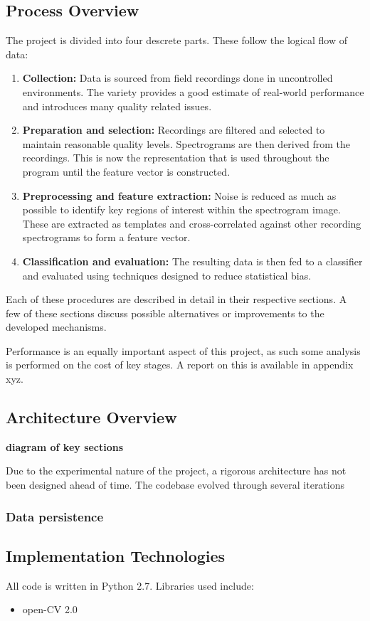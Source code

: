 \subsection{Process Overview}
The project is divided into four descrete parts.
These follow the logical flow of data:
\begin{enumerate}
  \item \textbf{Collection:}
    Data is sourced from field recordings done in uncontrolled environments.
    The variety provides a good estimate of real-world performance and
    introduces many quality related issues.

  \item \textbf{Preparation and selection:}
    Recordings are filtered and selected to maintain reasonable quality levels.
    Spectrograms are then derived from the recordings.
    This is now the representation that is used throughout the program until
    the feature vector is constructed.

  \item \textbf{Preprocessing and feature extraction:}
    Noise is reduced as much as possible to identify key regions of interest
    within the spectrogram image.
    These are extracted as templates and cross-correlated against other
    recording spectrograms to form a feature vector.

  \item \textbf{Classification and evaluation:}
    The resulting data is then fed to a classifier and evaluated using techniques
    designed to reduce statistical bias.
\end{enumerate}

Each of these procedures are described in detail in their respective sections.
A few of these sections discuss possible alternatives or improvements to the
developed mechanisms.

Performance is an equally important aspect of this project, as such some
analysis is performed on the cost of key stages.
A report on this is available in appendix xyz.

\subsection{Architecture Overview}
\textbf{diagram of key sections}

Due to the experimental nature of the project, a rigorous architecture has not
been designed ahead of time.
The codebase evolved through several iterations 

\subsubsection{Data persistence}


\subsection{Implementation Technologies}
All code is written in Python 2.7.
Libraries used include:
\begin{itemize}
  \item open-CV 2.0
\end{itemize}
